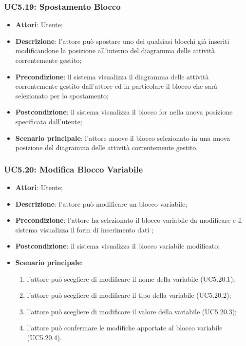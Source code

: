 \subsubsection{UC5.19: Spostamento Blocco}
\label{UC5.19}
\begin{itemize}
	\item \textbf{Attori}: Utente;
	\item \textbf{Descrizione}: l'attore può spostare uno dei qualsiasi blocchi già inseriti modificandone la posizione all'interno del diagramma delle attività correntemente gestito;
	\item \textbf{Precondizione}: il sistema visualizza il diagramma delle attività correntemente gestito dall'attore ed in particolare il blocco che sarà selezionato per lo spostamento;
	\item \textbf{Postcondizione}: il sistema visualizza il blocco for nella nuova posizione specificata dall'utente;
	\item \textbf{Scenario principale}: l'attore muove il blocco selezionato in una nuova posizione del diagramma delle attività correntemente gestito.
\end{itemize}

\subsubsection{UC5.20: Modifica Blocco Variabile}
\label{UC5.20}
\begin{itemize}
	\item \textbf{Attori}: Utente;
	\item \textbf{Descrizione}: l'attore può modificare un blocco variabile;
	\item \textbf{Precondizione}: l'attore ha selezionato il blocco variabile da modificare e il sistema visualizza il form di inserimento dati ;
	\item \textbf{Postcondizione}: il sistema visualizza il blocco variabile modificato;
	\item \textbf{Scenario principale}:
	\begin{enumerate}
		\item l'attore può scegliere di modificare il nome della variabile (UC5.20.1);
		\item l'attore può scegliere di modificare il tipo della variabile (UC5.20.2);
		\item l'attore può scegliere di modificare il valore della variabile (UC5.20.3);
		\item l'attore può confermare le modifiche apportate al blocco variabile (UC5.20.4).
	\end{enumerate}
\end{itemize}

